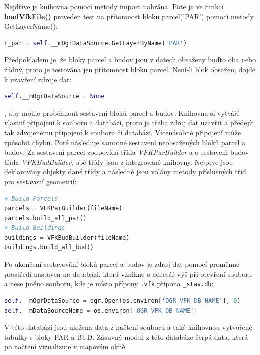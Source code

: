 Nejdříve je knihovna pomocí metody import nahrána. Poté je ve funkci \textbf{loadVfkFile()} proveden test na přítomnost bloku parcel('PAR') pomocí metody GetLayerName():
\begin{lstlisting}[language=Python, numbers=none]
t_par = self.__mOgrDataSource.GetLayerByName('PAR')
\end{lstlisting}
Předpokladem je, že bloky parcel a budov jsou v datech obsaženy buďto oba nebo žádný, proto je testována jen přítomnost bloku parcel. Není-li blok obsažen, dojde k uzavření zdroje dat:
\begin{lstlisting}[language=Python, numbers=none]
self.__mOgrDataSource = None
\end{lstlisting}
, aby mohlo proběhnout sestavení bloků parcel a budov. Knihovna si vytváří vlastní připojení k  souboru a databázi, proto je třeba zdroj dat uzavřít a předejít tak zdvojenému připojení k  souboru či databázi. Vícenásobné připojení může způsobit chybu. Poté následuje samotné sestavení neobsažených bloků parcel a budov. Za sestavení parcel zodpovídá třída \textit{VFKParBuilder} a o sestaveni budov třída \textit{VFKBudBuilder}, obě třídy jsou z integrované knihovny. Nejprve jsou deklarovány objekty dané třídy a následně jsou volány metody příslušných tříd pro sestavení geometrií:

\begin{lstlisting}[language=Python, numbers=none]
# Build Parcels
parcels = VFKParBuilder(fileName)
parcels.build_all_par()
# Build Buildings
buildings = VFKBudBuilder(fileName)
buildings.build_all_bud()
\end{lstlisting}

Po ukončení sestavování bloků parcel a budov je zdroj dat pomocí proměnné prostředí nastaven na databázi, která vznikne o adresář výš při otevření  souboru a nese jméno  souboru, kde je místo přípony \verb|.vfk| přípona \verb|_stav.db|:
{\small
\begin{lstlisting}[language=Python, numbers=none]
self.__mOgrDataSource = ogr.Open(os.environ['OGR_VFK_DB_NAME'], 0)
self.__mDataSourceName = os.environ['OGR_VFK_DB_NAME']
\end{lstlisting}}

V této databázi jsou uložena data z načtení  souboru a také knihovnou vytvořené tabulky s bloky PAR a BUD. Zásuvný modul z této databáze čerpá data, která po načtení vizualizuje v mapovém okně.

